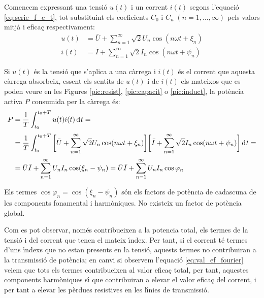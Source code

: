 Comencem expressant una tensi\'{o} $u(t)$ i un corrent $i(t)$
 segons l'equaci\'{o} \eqref{eq:serie_f_c_t}, tot substituint els
 coeficients $C_0$ i $C_n \;(n=1,\ldots,\infty)$ pels valors mitj\`{a} i efica\c{c}
 respectivament:
 \begin{align}
    u(t)  &= \bar{U} + \sum_{n=1}^\infty \sqrt{2} U_n \cos (n \omega t +
    \xi_n)\\[0.5ex]
    i(t)  &= \bar{I} + \sum_{n=1}^\infty \sqrt{2} I_n \cos (n \omega t + \psi_n)
 \end{align}

Si  $u(t)$ \'{e}s la tensi\'{o} que s'aplica a una c\`{a}rrega i $i(t)$ \'{e}s el
corrent que aquesta c\`{a}rrega absorbeix, essent els sentits de $u(t)$
i de $i(t)$ els mateixos que es poden veure en les Figures
\ref{pic:resist}, \ref{pic:capacit} o \ref{pic:induct}, la pot\`{e}ncia
activa $P$ consumida per la c\`{a}rrega \'{e}s:
\begin{equation}\begin{split}
    P &= \frac{1}{T} \int_{t_0}^{t_0+T} u(t) i(t) \diff t =
    \\[0.5ex]
     &= \frac{1}{T} \int_{t_0}^{t_0+T} \bigg[\bar{U} + \sum_{n=1}^\infty
    \sqrt{2} U_n \cos (n \omega t + \xi_n) \bigg]
    \bigg[\bar{I} + \sum_{n=1}^\infty \sqrt{2} I_n
    \cos (n \omega t + \psi_n)\bigg] \diff t=\\[0.5ex]
    &=\bar{U} \bar{I} + \sum_{n=1}^\infty U_n I_n
    \cos(\xi_n-\psi_n) = \bar{U} \bar{I} + \sum_{n=1}^\infty U_n I_n
    \cos \varphi_n \label{eq:pot_fu}
\end{split}\end{equation}

Els termes $\cos \varphi_n=\cos (\xi_n-\psi_n)$ s\'{o}n els factors de
pot\`{e}ncia de cadascuna de les components fonamental i harm\`{o}niques. No
existeix un factor de pot\`{e}ncia global.

 Com es pot observar, nom\'{e}s contribueixen a la potencia
total, els termes de la tensi\'{o} i del corrent que tenen el mateix
\'{\i}ndex. Per tant, si el corrent t\'{e} termes d'uns \'{\i}ndexs que no estan
presents en la tensi\'{o}, aquests termes no contribuiran a la
transmissi\'{o} de  pot\`{e}ncia; en canvi si observem l'equaci\'{o}
\eqref{eq:val_ef_fourier} veiem que tots els termes contribueixen al
valor efica\c{c} total, per tant, aquestes components harm\`{o}niques s\'{\i} que
contribuiran a elevar el valor efica\c{c} del corrent, i per tant a
elevar les p\`{e}rdues resistives en les l\'{\i}nies de transmissi\'{o}.

